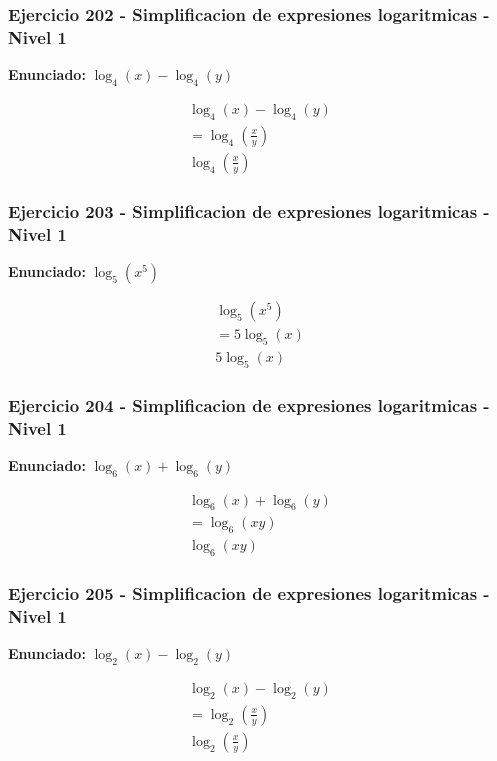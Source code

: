 \documentclass[12pt,a4paper]{article}
\begin{document}
\subsubsection*{Ejercicio 202 - Simplificacion de expresiones logaritmicas - Nivel 1}
\textbf{Enunciado:} \(\log_{4}\left(x\right)-\log_{4}\left(y\right)\)

\[
\begin{aligned}
\log_{4}\left(x\right)-\log_{4}\left(y\right)\\
=\log_{4}\left(\frac{x}{y}\right)\\
\boxed{\log_{4}\left(\frac{x}{y}\right)}
\end{aligned}
\]


\subsubsection*{Ejercicio 203 - Simplificacion de expresiones logaritmicas - Nivel 1}
\textbf{Enunciado:} \(\log_{5}\left(x^{5}\right)\)

\[
\begin{aligned}
\log_{5}\left(x^{5}\right)\\
=5\log_{5}\left(x\right)\\
\boxed{5\log_{5}\left(x\right)}
\end{aligned}
\]


\subsubsection*{Ejercicio 204 - Simplificacion de expresiones logaritmicas - Nivel 1}
\textbf{Enunciado:} \(\log_{6}\left(x\right)+\log_{6}\left(y\right)\)

\[
\begin{aligned}
\log_{6}\left(x\right)+\log_{6}\left(y\right)\\
=\log_{6}\left(xy\right)\\
\boxed{\log_{6}\left(xy\right)}
\end{aligned}
\]


\subsubsection*{Ejercicio 205 - Simplificacion de expresiones logaritmicas - Nivel 1}
\textbf{Enunciado:} \(\log_{2}\left(x\right)-\log_{2}\left(y\right)\)

\[
\begin{aligned}
\log_{2}\left(x\right)-\log_{2}\left(y\right)\\
=\log_{2}\left(\frac{x}{y}\right)\\
\boxed{\log_{2}\left(\frac{x}{y}\right)}
\end{aligned}
\]
\end{document}
